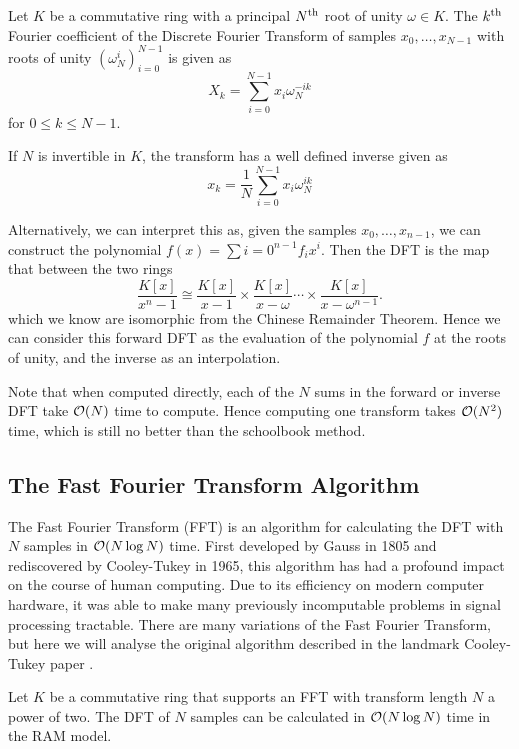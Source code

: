 \begin{definition}
    Let $K$ be a commutative ring with a principal $N^{\textrm{th}}$ root of unity $\omega \in K$.
    The $k^{\textrm{th}}$ Fourier coefficient of the Discrete Fourier Transform of samples $x_0, \ldots, x_{N-1}$ with roots of unity $(\omega_N^i)_{i=0}^{N-1}$ is given as
    \[
        X_k = \sum^{N-1}_{i=0}x_i\omega_{N}^{-ik}
    \]
    for $0 \leq k \leq N-1$.

    If $N$ is invertible in $K$, the transform has a well defined inverse given as 
    \[
        x_k = \frac{1}{N}\sum^{N-1}_{i=0}x_i\omega_{N}^{ik}
    \]
\end{definition}

Alternatively, we can interpret this as, given the samples $x_0, \ldots, x_{n-1}$, we can construct the polynomial $f(x) = \sum{i=0}^{n-1} f_i x^i$. Then the DFT is the map that between the two rings
\[
    \frac{K[x]}{x^n - 1} \cong \frac{K[x]}{x - 1} \times \frac{K[x]}{x - \omega} \cdots \times \frac{K[x]}{x - \omega^{n-1}}.
\]
which we know are isomorphic from the Chinese Remainder Theorem.
Hence we can consider this forward DFT as the evaluation of the polynomial $f$ at the roots of unity, and the inverse as an interpolation.

Note that when computed directly, each of the $N$ sums in the forward or inverse DFT take $\mathcal O(N)$ time to compute. Hence computing one transform takes $\mathcal O(N^2)$ time, which is still no better than the schoolbook method.

\subsection{The Fast Fourier Transform Algorithm}

The Fast Fourier Transform (FFT) is an algorithm for calculating the DFT with $N$ samples in $\mathcal O(N \log N)$ time. First developed by Gauss in 1805 \cite{gauss} and rediscovered by Cooley-Tukey in 1965, this algorithm has had a profound impact on the course of human computing. Due to its efficiency on modern computer hardware, it was able to make many previously incomputable problems in signal processing tractable.
There are many variations of the Fast Fourier Transform, but here we will analyse the original algorithm described in the landmark Cooley-Tukey paper \cite{fft}.

\begin{theorem}\label{thm:fft}
    Let $K$ be a commutative ring that supports an FFT with transform length $N$ a power of two. The DFT of $N$ samples can be calculated in $\mathcal O(N\log N)$ time in the RAM model.
\end{theorem}

